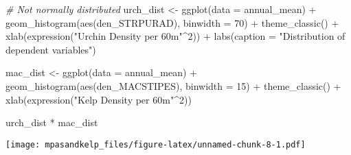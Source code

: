 \documentclass[
]{article}
\newenvironment{Shaded}{\begin{snugshade}}{\end{snugshade}}
\newcommand{\AttributeTok}[1]{\textcolor[rgb]{0.77,0.63,0.00}{#1}}
\newcommand{\CommentTok}[1]{\textcolor[rgb]{0.56,0.35,0.01}{\textit{#1}}}
\newcommand{\DecValTok}[1]{\textcolor[rgb]{0.00,0.00,0.81}{#1}}
\newcommand{\FunctionTok}[1]{\textcolor[rgb]{0.00,0.00,0.00}{#1}}
\newcommand{\NormalTok}[1]{#1}
\newcommand{\OtherTok}[1]{\textcolor[rgb]{0.56,0.35,0.01}{#1}}
\newcommand{\SpecialCharTok}[1]{\textcolor[rgb]{0.00,0.00,0.00}{#1}}
\newcommand{\StringTok}[1]{\textcolor[rgb]{0.31,0.60,0.02}{#1}}
\begin{document}
\begin{Shaded}
\begin{Highlighting}[]
\CommentTok{\# Not normally distributed}
\NormalTok{urch\_dist }\OtherTok{\textless{}{-}} \FunctionTok{ggplot}\NormalTok{(}\AttributeTok{data =}\NormalTok{ annual\_mean) }\SpecialCharTok{+}
  \FunctionTok{geom\_histogram}\NormalTok{(}\FunctionTok{aes}\NormalTok{(den\_STRPURAD), }\AttributeTok{binwidth =} \DecValTok{70}\NormalTok{) }\SpecialCharTok{+}
  \FunctionTok{theme\_classic}\NormalTok{() }\SpecialCharTok{+}
  \FunctionTok{xlab}\NormalTok{(}\FunctionTok{expression}\NormalTok{(}\StringTok{"Urchin Density per 60m"}\SpecialCharTok{\^{}}\DecValTok{2}\NormalTok{)) }\SpecialCharTok{+}
  \FunctionTok{labs}\NormalTok{(}\AttributeTok{caption =} \StringTok{"Distribution of dependent variables"}\NormalTok{) }



\NormalTok{mac\_dist }\OtherTok{\textless{}{-}} \FunctionTok{ggplot}\NormalTok{(}\AttributeTok{data =}\NormalTok{ annual\_mean) }\SpecialCharTok{+}
  \FunctionTok{geom\_histogram}\NormalTok{(}\FunctionTok{aes}\NormalTok{(den\_MACSTIPES), }\AttributeTok{binwidth =} \DecValTok{15}\NormalTok{) }\SpecialCharTok{+}
  \FunctionTok{theme\_classic}\NormalTok{() }\SpecialCharTok{+}
  \FunctionTok{xlab}\NormalTok{(}\FunctionTok{expression}\NormalTok{(}\StringTok{"Kelp Density per 60m"}\SpecialCharTok{\^{}}\DecValTok{2}\NormalTok{)) }

\NormalTok{urch\_dist }\SpecialCharTok{*}\NormalTok{ mac\_dist}
\end{Highlighting}
\end{Shaded}

\texttt{[image: mpasandkelp\_files/figure-latex/unnamed-chunk-8-1.pdf]}
\end{document}
